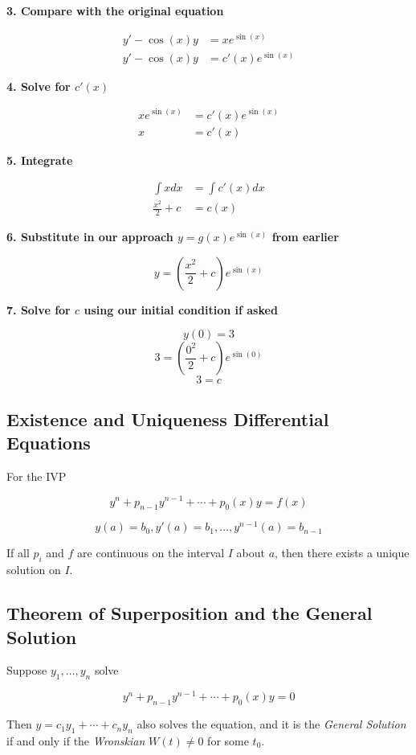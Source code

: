\textbf{3. Compare with the original equation}

\begin{align*}
    y' -\cos(x)y &= x e^{\sin(x)}\\
    y' - \cos(x)y &= c'(x)e^{\sin(x)}
\end{align*}

\textbf{4. Solve for \(c'(x)\)}

\begin{align*}
    xe^{\sin(x)} &= c'(x)e^{\sin(x)}\\
    x &= c'(x)
\end{align*}

\textbf{5. Integrate}

\begin{align*}
    \int x dx &= \int c'(x)dx\\
    \frac{x^2}{2} + c &= c(x)
\end{align*}

\textbf{6. Substitute in our approach \(y = g(x)e^{\sin(x)}\) from earlier}

\[
    y = \left(\frac{x^2}{2} + c\right)e^{\sin(x)}
\]

\textbf{7. Solve for \(c\) using our initial condition if asked}

\[
    y(0) = 3
\]
\[
    3 = \left(\frac{0^2}{2} + c\right)e^{\sin(0)}
\]
\[
    3 = c
\]

\subsection{Existence and Uniqueness Differential Equations}

For the IVP

\[
    y^{n} + p_{n - 1}y^{n - 1}+ \cdots + p_0 (x)y = f(x)
\]

\[
    y(a) = b_0, y'(a) = b_1, \dots, y^{n - 1}(a) = b_{n - 1}
\]

If all \(p_i\) and \(f\) are continuous on the interval \(I\) about \(a\), then
there exists a unique solution on \(I\).

\subsection{Theorem of Superposition and the General Solution}

Suppose \(y_1, \dots, y_n\) solve 

\[
    y^{n} + p_{n - 1}y^{n - 1}+ \cdots + p_0 (x)y = 0
\]

Then \(y = c_1 y_1 + \cdots + c_n y_n\) also solves the equation, and it is the 
\emph{General Solution} if and only if the \emph{Wronskian} \(W(t) \ne 0\) for some \(t_0\).

